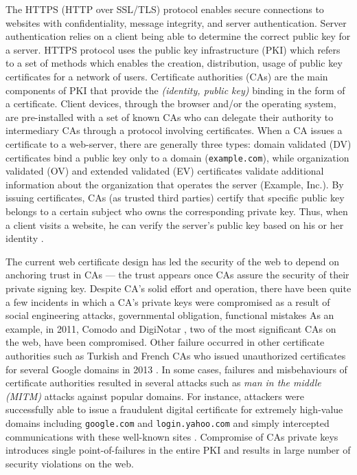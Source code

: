 The HTTPS (HTTP over SSL/TLS) protocol enables secure connections to websites with confidentiality, message integrity, and server authentication. Server authentication relies on a client being able to determine the correct public key for a server. HTTPS protocol uses the public key infrastructure (PKI) which refers to a set of methods which enables the creation, distribution, usage of public key certificates for a network of users. Certificate authorities (CAs) are the main components of PKI that provide the \emph {(identity, public key)} binding in the form of a certificate. Client devices, through the browser and/or the operating system, are pre-installed with a set of known CAs who can delegate their authority to intermediary CAs through a protocol involving certificates. When a CA issues a certificate to a web-server, there are generally three types: domain validated (DV) certificates bind a public key only to a domain (\eg \texttt{example.com}), while organization validated (OV) and extended validated (EV) certificates validate additional information about the organization that operates the server (Example, Inc.). By issuing certificates, CAs (as trusted third parties) certify that specific public key belongs to a certain subject who owns the corresponding private key. Thus, when a client visits a website, he can verify the server's public key based on his or her identity \cite{ellison1999nature, perlman1999overview,housley2002internet,wenbo2004modern,adams2003understanding,vacca2004public}.

The current web certificate design has led the security of the web to depend on anchoring trust in CAs --- the trust appears once CAs assure the security of their private signing key. Despite CA's solid effort and operation, there have been quite a few incidents in which a CA's private keys were compromised as a result of social engineering attacks, governmental obligation, functional mistakes \etc As an example, in 2011, Comodo\cite{eckersley2010observatory,ComodoRe52:online} and DigiNotar \cite{kaminskypki}, two of the most significant CAs on the web, have been compromised. Other failure occurred in other certificate authorities such as Turkish and French CAs who issued unauthorized certificates for several Google domains in 2013 \cite{GoogleOn40:online,GoogleOn64:online}. In some cases, failures and misbehaviours of certificate authorities resulted in several attacks such as \emph{man in the middle (MITM)} attacks against popular domains. For instance, attackers were successfully able to issue a fraudulent digital certificate for extremely high-value domains including \texttt{google.com} and \texttt{login.yahoo.com} and simply intercepted communications with these well-known sites \cite{GoogleYa98:online}. Compromise of CAs private keys introduces single point-of-failures in the entire PKI and results in large number of security violations on the web. 


